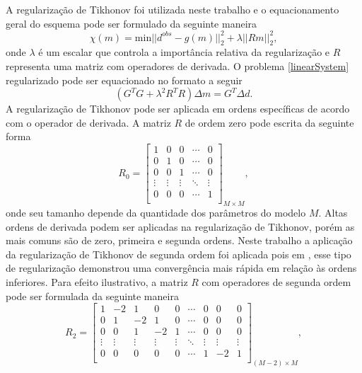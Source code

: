 A regularização de Tikhonov foi utilizada neste trabalho e o equacionamento geral do esquema pode ser formulado da seguinte maneira
\begin{equation}
	\chi(m) = \text{min}||d^{obs} - g(m)||^2_2 +\lambda||Rm||^2_2,
\end{equation}
\noindent onde $\lambda$ é um escalar que controla a importância relativa da regularização e $R$ representa uma matriz com operadores de derivada. O problema \ref{linearSystem} regularizado pode ser equacionado no formato a seguir
\begin{equation}
	(G^TG + \lambda^2 R^TR)\Delta m = G^T \Delta d.
\end{equation}
\noindent A regularização de Tikhonov pode ser aplicada em ordens específicas de acordo com o operador de derivada. A matriz $R$ de ordem zero pode escrita da seguinte forma
\begin{equation}
	R_0 = 
	\begin{bmatrix}
		1 & 0 & 0 & \cdots & 0 \\
		0 & 1 & 0 & \cdots & 0 \\
		0 & 0 & 1 & \cdots & 0 \\
		\vdots & \vdots & \vdots & \ddots & \vdots \\
		0 & 0 & 0 & \cdots & 1 \\
	\end{bmatrix}
	_{M\times M},
\end{equation}
\noindent onde seu tamanho depende da quantidade dos parâmetros do modelo $M$. Altas ordens de derivada podem ser aplicadas na regularização de Tikhonov, porém as mais comuns são de zero, primeira e segunda ordens. Neste trabalho a aplicação da regularização de Tikhonov de segunda ordem foi aplicada pois em , esse tipo de regularização demonstrou uma convergência mais rápida em relação às ordens inferiores. Para efeito ilustrativo, a matriz $R$ com operadores de segunda ordem pode ser formulada da seguinte maneira
\begin{equation}
	R_2 = 
	\begin{bmatrix}
		1      & -2     & 1      & 0      & 0      & \cdots & 0      & 0      & 0 \\
		0      & 1      & -2     & 1      & 0      & \cdots & 0      & 0      & 0 \\
		0      & 0      & 1      & -2     & 1      & \cdots & 0      & 0      & 0 \\
		\vdots & \vdots & \vdots & \vdots & \vdots & \ddots & \vdots & \vdots & \vdots \\
		0      & 0      & 0      & 0      & 0      & \cdots & 1      & -2     & 1 \\
	\end{bmatrix}
	_{(M-2)\times M},
\end{equation}
